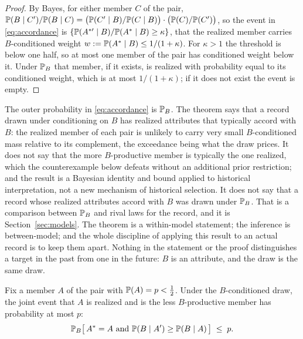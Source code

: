 \begin{proof}
By Bayes, for either member $C$ of the pair,
$\mathbb{P}(B\mid C')/\mathbb{P}(B\mid C)=\bigl(\mathbb{P}(C'\mid B)/\mathbb{P}(C\mid B)\bigr)\cdot
\bigl(\mathbb{P}(C)/\mathbb{P}(C')\bigr)$, so the event in \eqref{eq:accordance} is
$\{\mathbb{P}(A^{\ast\prime}\mid B)/\mathbb{P}(A^\ast\mid B)\ge\kappa\}$, that the
realized member carries $B$-conditioned weight $w:=\mathbb{P}(A^\ast\mid B)\le
1/(1+\kappa)$. For $\kappa>1$ the threshold is below one half, so at most
one member of the pair has conditioned weight below it. Under $\mathbb{P}_B$ that
member, if it exists, is realized with probability equal to its
conditioned weight, which is at most $1/(1+\kappa)$; if it does not exist
the event is empty.
\end{proof}

\begin{remark}
\label{rem:scope}
The outer probability in \eqref{eq:accordance} is $\mathbb{P}_B$. The theorem
says that a record drawn under conditioning on $B$ has realized
attributes that typically accord with $B$: the realized member of each pair is unlikely to carry very small $B$-conditioned mass relative to its complement, the exceedance being what the draw prices. It does not say that the more $B$-productive member is typically the one realized, which the counterexample below defeats without an additional prior restriction; and the result is a Bayesian identity and bound applied to historical interpretation, not a new mechanism of historical selection. It does not say that a record whose realized attributes
accord with $B$ was drawn under $\mathbb{P}_B$. That is a comparison between
$\mathbb{P}_B$ and rival laws for the record, and it is Section~\ref{sec:models}.
The theorem is a within-model statement; the inference is between-model;
and the whole discipline of applying this result to an actual record is
to keep them apart. Nothing in the statement or the proof distinguishes a
target in the past from one in the future: $B$ is an attribute, and the
draw is the same draw.
\end{remark}

\begin{corollary}\label{cor:prior}
Fix a member $A$ of the pair with $\mathbb{P}(A)=p<\tfrac12$. Under the
$B$-conditioned draw, the joint event that $A$ is realized and is the
less $B$-productive member has probability at most $p$:
\begin{equation}\label{eq:prior}
\mathbb{P}_B\bigl[\,A^\ast=A\ \text{and}\ \mathbb{P}(B\mid A')\ge\mathbb{P}(B\mid A)\,\bigr]\;\le\;p.
\end{equation}
\end{corollary}

